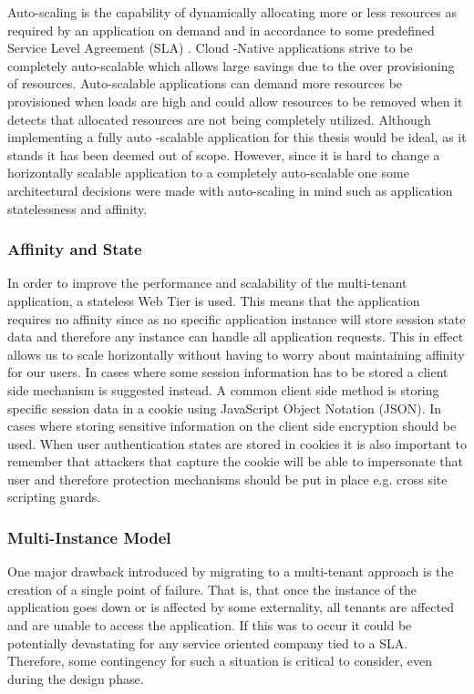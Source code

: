Auto-scaling is the capability of dynamically allocating more or less resources as required by an application on demand and in accordance to some predefined Service Level Agreement (SLA) \cite{Homer2014}. Cloud -Native applications strive to be completely auto-scalable which allows large savings due to the over provisioning of resources. Auto-scalable applications can demand more resources be provisioned when loads are high and could allow resources to be removed when it detects that allocated resources are not being completely utilized. Although implementing a fully auto -scalable application for this thesis would be ideal, as it stands it has been deemed out of scope. However, since it is hard to change a horizontally scalable application to a completely auto-scalable one some architectural decisions were made with auto-scaling in mind such as application statelessness and affinity.


\subsubsection{Affinity and State}

In order to improve the performance and scalability of the multi-tenant application, a stateless Web Tier is used. This means that the application requires no affinity since as no specific application instance will store session state data and therefore any instance can handle all application requests. This in effect allows us to scale horizontally without having to worry about maintaining affinity for our users. In cases where some session information has to be stored a client side mechanism is suggested instead. A common client side method is storing specific session data in a cookie using JavaScript Object Notation (JSON). In cases where storing sensitive information on the client side encryption should be used. When user authentication states are stored in cookies it is also important to remember that attackers that capture the cookie will be able to impersonate that user and therefore protection mechanisms should be put in place e.g. cross site scripting guards.


\subsubsection{Multi-Instance Model}
\label{sec:multiinstance}
One major drawback introduced by migrating to a multi-tenant approach is the creation of a single point of failure. That is, that once the instance of the application goes down or is affected by some externality, all tenants are affected and are unable to access the application. If this was to occur it could be potentially devastating for any service oriented company tied to a SLA. Therefore, some contingency for such a situation is critical to consider, even during the design phase.
 
